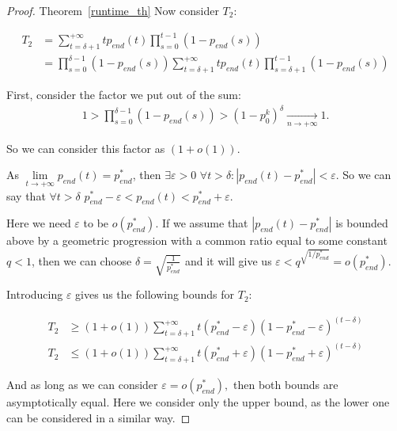 \documentclass{article}
\begin{document}
\begin{proof}{Theorem~\ref{runtime_th}}
Now consider $T_2$:

\begin{align*}
  T_2 &= \sum\limits_{t = \delta + 1}^{+\infty} t p_{end}(t) \prod\limits_{s = 0}^{t - 1} (1 - p_{end}(s)) \\
      &= \prod\limits_{s = 0}^{\delta - 1} (1 - p_{end}(s)) \sum\limits_{t = \delta + 1}^{+\infty} t p_{end}(t) \prod\limits_{s = \delta + 1}^{t - 1} (1 - p_{end}(s))
\end{align*}

First, consider the factor we put out of the sum:
\begin{align*}
  1 > \prod\limits_{s = 0}^{\delta - 1} (1 - p_{end}(s)) > (1 - p_0^k)^\delta \xrightarrow[n \to +\infty]{} 1.
\end{align*}

So we can consider this factor as $(1 + o(1)).$

As $\lim\limits_{t \to +\infty} p_{end}(t) = p_{end}^*$, then $\exists \varepsilon > 0$ $\forall t > \delta: |p_{end}(t) - p_{end}^*| < \varepsilon$. So we can say that $\forall t > \delta$ $p_{end}^* - \varepsilon < p_{end}(t) < p_{end}^* + \varepsilon.$

Here we need $\varepsilon$ to be $o(p_{end}^*).$ If we assume that $|p_{end}(t) - p_{end}^*|$ is bounded above by a geometric progression with a common ratio equal to some constant $q < 1$, then we can choose $\delta = \sqrt{\frac{1}{p_{end}^*}}$ and it will give us $\varepsilon < q^{\sqrt{1/p_{end}^*}}= o(p_{end}^*).$

Introducing $\varepsilon$ gives us the following bounds for $T_2:$

\begin{align*}
T_2 &\ge (1 + o(1)) \sum\limits_{t = \delta + 1}^{+\infty} t (p_{end}^* - \varepsilon) (1 - p_{end}^* - \varepsilon)^{(t - \delta)} \\
T_2 &\le (1 + o(1)) \sum\limits_{t = \delta + 1}^{+\infty} t (p_{end}^* + \varepsilon) (1 - p_{end}^* + \varepsilon)^{(t - \delta)}
\end{align*}

And as long as we can consider $\varepsilon = o(p_{end}^*),$ then both bounds are asymptotically equal. Here we consider only the upper bound, as the lower one can be considered in a similar way.


\end{proof}
\end{document}
